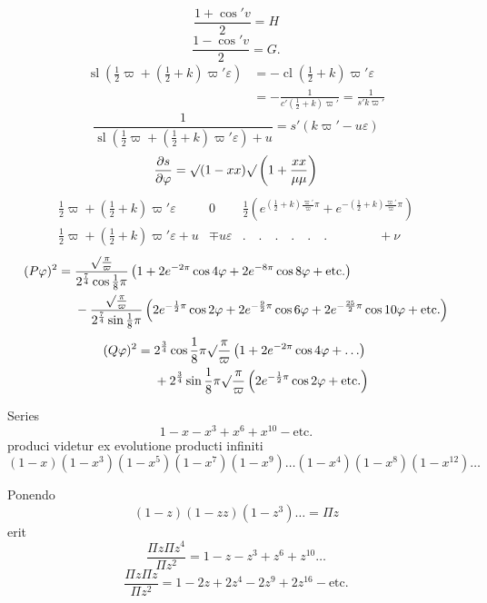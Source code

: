 \[\frac{1+\cos{}'v}2=H\]
\[\frac{1-\cos{}'v}2=G.\]
\ClosingRule
\noindent [S.\ 39]
\[\begin{aligned}
\operatorname{sl}\left(\tfrac12\varpi+(\tfrac12+k)\varpi'\varepsilon\right)
&=-\operatorname{cl}(\tfrac12+k)\varpi'\varepsilon\\
&=-\frac1{c'(\frac12+k)\varpi'}=\frac1{s'k\varpi'}
\end{aligned}\]
\[\frac1{\operatorname{sl}\left(\frac12\varpi+(\frac12+k)\varpi'\varepsilon\right)+u}=s'(k\varpi'-u\varepsilon)\]
\[\frac{\partial s}{\partial\varphi}=\surd(1-xx)\surd\left(1+\frac{xx}{\mu\mu}\right)\]
\clearpage
{}
{\small
\[\begin{array}{c|c|c}
\frac12\varpi+(\frac12+k)\varpi'\varepsilon&0&
\frac12\left(e^{(\frac12+k)\frac{\varpi'}\varpi\pi}+e^{-(\frac12+k)\frac{\varpi'}\varpi\pi}\right)\\[1.2em]
\frac12\varpi+(\frac12+k)\varpi'\varepsilon+u&\mp u\varepsilon&
.\quad.\quad.\quad.\quad.\quad.\qquad\qquad+\nu
\end{array}\]}
\ClosingRule
\[\begin{aligned}
(P\varphi)^2={}&\frac{\surd\frac\pi\varpi}{2^{\frac74}\cos\frac18\pi}
\left(1+2e^{-2\pi}\cos4\varphi+2e^{-8\pi}\cos8\varphi+\text{etc.}\right)\\
&-\frac{\surd\frac\pi\varpi}{2^{\frac74}\sin\frac18\pi}
\left(2e^{-\frac12\pi}\cos2\varphi+2e^{-\frac92\pi}\cos6\varphi
+2e^{-\frac{25}2\pi}\cos10\varphi+\text{etc.}\right)
\end{aligned}\]
\[\begin{aligned}
(Q\varphi)^2={}&2^{\frac34}\cos\frac18\pi\surd\frac\pi\varpi
\left(1+2e^{-2\pi}\cos4\varphi+\ldots\right)\\
&+2^{\frac34}\sin\frac18\pi\surd\frac\pi\varpi
\left(2e^{-\frac12\pi}\cos2\varphi+\text{etc.}\right)
\end{aligned}\]
\noindent [S.\ 40]
\par\indent Series
\[1-x-x^3+x^6+x^{10}-\text{etc.}\]
\noindent produci videtur ex evolutione producti infiniti
{\small
\[(1-x)(1-x^3)(1-x^5)(1-x^7)(1-x^9)\ldots(1-x^4)(1-x^8)(1-x^{12})\ldots\]}
\par\indent Ponendo
\[(1-z)(1-zz)(1-z^3)\ldots=\Pi z\]
\noindent erit
\begin{equation*}\tag*{1)}\frac{\Pi z\Pi z^4}{\Pi z^2}=1-z-z^3+z^6+z^{10}\ldots\end{equation*}
\begin{equation*}\tag*{2)}\frac{\Pi z\Pi z}{\Pi z^2}=1-2z+2z^4-2z^9+2z^{16}-\text{etc.}\end{equation*}

